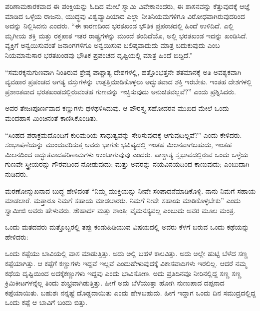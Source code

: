 \vskip 5pt

ಪರಿಣಾಮಕಾರಕವಾದ ಈ ಪಂಕ್ತಿಯನ್ನು ಓದಿದ ಮೇಲೆ ಸ್ವಾಮಿ ವಿವೇಕಾನಂದರು, ಈ ಶಾಸನವನ್ನು ಕೆತ್ತುವುದಕ್ಕೆ ಆಜ್ಞೆ ಮಾಡಿದ ಒಳ್ಳೆಯ ರಾಜನು, ಯುದ್ಧವು ವಿಶ್ವವ್ಯಾಪಿಯಾದ ಎಲ್ಲಾ ನೀತಿನಿಯಮಗಳಿಗೂ ವಿರೋಧವಾಗಿರುವುದರಿಂದ ಅದನ್ನು ನಿಲ್ಲಿಸಿದನು ಎಂದರು. “ಈ ಕಾರಣದಿಂದ ಭರತಖಂಡ ಭೌತಿಕ ಪ್ರಪಂಚದಲ್ಲಿ ಹಿಂದೆ ಉಳಿದಿದೆ. ಎಲ್ಲಿ ಮೃಗೀಯ ಶಕ್ತಿ ಮತ್ತು ರಕ್ತಪಾತ ಇತರ ರಾಷ್ಟ್ರಗಳನ್ನು ಮುಂದೆ ತಂದಿದೆಯೊ, ಅಲ್ಲಿ ಭರತಖಂಡ ಇದನ್ನು ಖಂಡಿಸಿದೆ. ವ್ಯಕ್ತಿಗೆ ಅನ್ವಯಿಸುವಂತೆ ಜನಾಂಗಗಳಿಗೂ ಅನ್ವಯಿಸುವ ಬಲಿಷ್ಠವಾದುದು ಮಾತ್ರ ಬದುಕುವುದು ಎಂಬ ನಿಯಮಾನುಸಾರ ಭರತಖಂಡವು ಭೌತಿಕ ಪ್ರಪಂಚದ ದೃಷ್ಟಿಯಲ್ಲಿ ಮಾತ್ರ ಹಿಂದೆ ಬಿದ್ದಿದೆ.”

\vskip 5pt

“ಸಮರಕ್ಕನುಗುಣವಾಗಿ ನಿಂತಿರುವ ಶ್ರೇಷ್ಠ ಪಾಶ್ಚಾತ್ಯ ದೇಶಗಳಲ್ಲಿ, ಹತ್ತೊಂಭತ್ತನೇ ಶತಮಾನಕ್ಕೆ ಅತಿ ಅವಶ್ಯಕವಾಗಿ ವ್ಯವಹಾರ ಪ್ರಪಂಚದ ಅಗತ್ಯ ವಸ್ತುಗಳನ್ನು ಉತ್ಪತ್ತಿಮಾಡಿಕೊಳ್ಳಲು ಅದ್ಭುತವಾದ ಶಕ್ತಿ ಇರಬೇಕು. ಇಂತಹ ದೇಶಗಳಲ್ಲಿ ಪ್ರಶಾಂತವಾದ ಭರತಖಂಡದಲ್ಲಿರುವಂತಹ ಗುಣವನ್ನು ಇಚ್ಚಿಸುವುದು ಅನುಚಿತವಲ್ಲವೆ?” ಎಂದು ಪ್ರಶ್ನಿಸಿದರು.

\vskip 5pt

ಅವರ ತೇಜಃಪೂರ್ಣವಾದ ಕಣ್ಣುಗಳು ಥಳಥಳಿಸಿದುವು. ಆ ಪೌರಸ್ತ್ಯ ಸಹೋದರನ ಮುಖದ ಮೇಲೆ ಒಂದು ಮಂದಹಾಸ ಮಿಂಚಿನಂತೆ ಕಾಣಿಸಿಕೊಂಡಿತು.

\vskip 5pt

“ಸಿಂಹದ ಪರಾಕ್ರಮದೊಂದಿಗೆ ಕುರಿಮರಿಯ ಸಾಧುತ್ವವನ್ನು ಸೇರಿಸುವುದಕ್ಕೆ ಆಗುವುದಿಲ್ಲವೆ?” ಎಂದು ಕೇಳಿದರು. ಸಂಭಾಷಣೆಯನ್ನು ಮುಂದುವರಿಸುತ್ತ ಅವರು ಭಾಗಶಃ ಭವಿಷ್ಯದಲ್ಲಿ ಇಂತಹ ಮಿಲನವಾಗಬಹುದು, ಇಂತಹ ಮಿಲನದಿಂದ ಅದ್ಭುತವಾದ\break ಪರಿಣಾಮಗಳು ಉಂಟಾಗುವುವು ಎಂದರು. ಪಾಶ್ಚಾತ್ಯ ಸ್ವಭಾವದಲ್ಲಿರುವ ಒಂದು ಒಳ್ಳೆಯ ಗುಣವೇ ಸ್ತ್ರೀಯರನ್ನು ಗೌರವದಿಂದ ನೋಡುವುದು; ಮತ್ತು ಅವರನ್ನು ನಯವಿನಯದಿಂದ ಕಾಣುವುದು; ಎಂಬುದಾಗಿ ನುಡಿದರು.

\vskip 5pt

ಮರಣೋನ್ಮುಖನಾದ ಬುದ್ಧ ಹೇಳಿದಂತೆ “ನಿಮ್ಮ ಮುಕ್ತಿಯನ್ನು ನೀವೇ ಸಂಪಾದನೆ\break ಮಾಡಿಕೊಳ್ಳಿ. ನಾನು ನಿಮಗೆ ಸಹಾಯ ಮಾಡಲಾರೆ. ಮತ್ತಾರೂ ನಿಮಗೆ ಸಹಾಯ ಮಾಡಲಾರರು. ನಿಮಗೆ ನೀವೇ ಸಹಾಯ ಮಾಡಿಕೊಳ್ಳಬೇಕು” ಎಂದು ಸ್ವಾಮೀಜಿ ಅವರು ಹೇಳುವರು. ಸೌಹಾರ್ದ ಮತ್ತು ಶಾಂತಿ; ವೈಮನಸ್ಯವಲ್ಲ ಎಂಬುದು ಅವರ ಮೂಲ ಮಂತ್ರ.

\vskip 5pt

ಒಂದು ಮತದವರು ಮತ್ತೊಬ್ಬರಲ್ಲಿ ತಪ್ಪು ಕಂಡುಹಿಡಿಯುವ ವಿಷಯದಲ್ಲಿ ಅವರು ಕೆಳಗೆ ಬರುವ ಒಂದು ಕಥೆಯನ್ನು ಹೇಳಿದರು:

\eject

ಒಂದು ಕಪ್ಪೆಯು ಬಾವಿಯಲ್ಲಿ ವಾಸ ಮಾಡುತ್ತಿತ್ತು. ಅದು ಅಲ್ಲಿ ಬಹಳ ಕಾಲವಿತ್ತು. ಅದು ಅಲ್ಲೇ ಹುಟ್ಟಿ ಬೆಳೆದ ಸಣ್ಣ ಕಪ್ಪೆಯಾಗಿತ್ತು. ಆ ಕಪ್ಪೆಗೆ ಕಣ್ಣುಗಳು ಇದ್ದವೆ ಇಲ್ಲವೆ ಎಂದು\break ಹೇಳುವುದಕ್ಕೆ ವಿಕಾಸವಾದಿಗಳು ಇರಲಿಲ್ಲ. ಆದರೆ ನಮ್ಮ ಕಥೆಯ ದೃಷ್ಟಿಯಿಂದ ಅದಕ್ಕೆ\break ಕಣ್ಣುಗಳು ಇದ್ದವು ಎಂದು ಭಾವಿಸೋಣ. ಅದು ಪ್ರತಿದಿನವೂ ನೀರಿನಲ್ಲಿದ್ದ ಸಣ್ಣ ಸಣ್ಣ ಕ್ರಿಮಿಕೀಟಗಳನ್ನೆಲ್ಲ ತಿಂದು ಶುಭ್ರವಾಗಿಡುತ್ತಿತ್ತು. ಹೀಗೆ ಅದು ಬೆಳೆಯುತ್ತಾ ಹೋಗಿ ನುಣುಪಾದ ದಪ್ಪನಾದ ಕಪ್ಪೆಯಾಯಿತು. ಬಹುಶಃ ನನ್ನಷ್ಟೆ ದೊಡ್ಡದಾಯಿತು ಎಂದು ಹೇಳಬಹುದು. ಹೀಗೆ ಇದ್ದಾಗ ಒಂದು ದಿನ ಸಮುದ್ರದಲ್ಲಿದ್ದ ಒಂದು ಕಪ್ಪೆ ಆ ಬಾವಿಗೆ ಬಂದು ಬಿತ್ತು.

